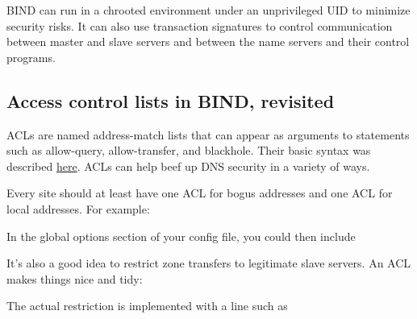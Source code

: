 
\protect\hypertarget{part0024_split_053.htmlux5cux23_idIndexMarker2234}{}{}BIND
can run in a {chroot}ed environment under an unprivileged UID to
minimize security risks. It can also use transaction signatures to
control communication between master and slave servers and between the
name servers and their control programs.

\protect\hypertarget{part0024_split_054.html}{}{}

\hypertarget{part0024_split_054.htmlux5cux23_idContainer1069}{}
\hypertarget{part0024_split_054.htmlux5cux23calibre_pb_53}{%
\subsection[Access control lists in BIND,
revisited]{\texorpdfstring{\protect\hypertarget{part0024_split_054.htmlux5cux23_idTextAnchor933}{}{}Access
control lists in BIND,
revisited}{Access control lists in BIND, revisited}}\label{part0024_split_054.htmlux5cux23calibre_pb_53}}

\protect\hypertarget{part0024_split_054.htmlux5cux23_idIndexMarker2235}{}{}\protect\hypertarget{part0024_split_054.htmlux5cux23_idIndexMarker2236}{}{}\protect\hypertarget{part0024_split_054.htmlux5cux23_idIndexMarker2237}{}{}ACLs
are named address-match lists that can appear as arguments to statements
such as
\protect\hypertarget{part0024_split_054.htmlux5cux23_idIndexMarker2238}{}{}{allow-query},
\protect\hypertarget{part0024_split_054.htmlux5cux23_idIndexMarker2239}{}{}{allow-transfer},
and
\protect\hypertarget{part0024_split_054.htmlux5cux23_idIndexMarker2240}{}{}{blackhole}.
Their basic syntax was described
\protect\hyperlink{part0024_split_038.htmlux5cux23_idTextAnchor904}{here}.
ACLs can help beef up DNS security in a variety of ways.

Every site should at least have one ACL for bogus addresses and one ACL
for local addresses. For example:


In the global {options} section of your config file, you could then
include


It's also a good idea to restrict zone transfers to legitimate slave
servers. An ACL makes things nice and tidy:


The actual restriction is implemented with a line such as

